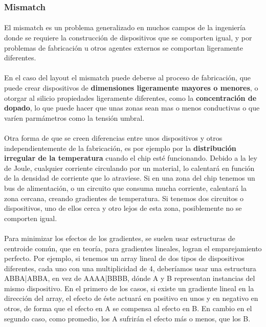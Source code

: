 \subsubsection{Mismatch}

\paragraph{} El mismatch es un problema generalizado en muchos campos de
la ingeniería donde se requiere la construcción de dispositivos que se comporten
igual, y por problemas de fabricación u otros agentes externos se comportan ligeramente
diferentes.

\paragraph{} En el caso del layout el mismatch puede deberse al proceso de fabricación,
que puede crear dispositivos de \textbf{dimensiones ligeramente mayores o menores},
o otorgar al silicio propiedades ligeramente diferentes, como la \textbf{concentración de
dopado}, lo que puede hacer que unas zonas sean mas o menos conductivas o que varíen
parmámetros como la tensión umbral.

\paragraph{} Otra forma de que se creen diferencias entre unos dispositivos y otros
independientemente de la fabricación, es por ejemplo por la \textbf{distribución irregular
de la temperatura} cuando el chip esté funcionando. Debido a la ley de Joule, cualquier
corriente circulando por un material, lo calentará en función de la densidad de corriente
que lo atraviese. Si en una zona del chip tenemos un bus de alimentación, o un circuito
que consuma mucha corriente, calentará la zona cercana, creando gradientes de temperatura.
Si tenemos dos circuitos o dispositivos, uno de ellos cerca y otro lejos de esta zona,
posiblemente no se comporten igual.

\paragraph{} Para minimizar los efectos de los gradientes, se suelen usar estructuras
de centroide común, que en teoría, para gradientes lineales, logran el emparejamiento
perfecto. Por ejemplo, si tenemos un array lineal de dos tipos de dispositivos diferentes,
cada uno con una multiplicidad de 4, deberíamos usar una estructura ABBA|ABBA, en vez
de AAAA|BBBB, dónde A y B representan instancias del mismo dispositivo. En el primero
de los casos, si existe un gradiente lineal en la dirección del array, el efecto de éste
actuará en positivo en unos y en negativo en otros, de forma que el efecto en A se compensa
al efecto en B. En cambio en el segundo caso, como promedio, los A sufrirán el efecto
más o menos, que los B.

